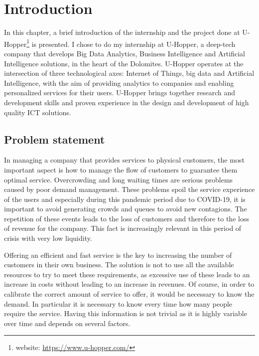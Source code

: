 \chapter{Introduction}
\label{cha:intro}
\vspace{0.4 cm} 

In this chapter, a brief introduction of the internship and the project done at U-Hopper\footnote{ website: \url{https://www.u-hopper.com/} } is presented.
I chose to do my internship at U-Hopper, a deep-tech company that develops Big Data Analytics, Business Intelligence and Artificial Intelligence solutions, in the heart of the Dolomites.
U-Hopper operates at the intersection of three technological axes: Internet of Things, big data and Artificial Intelligence, with the aim of providing analytics to companies and enabling personalized services for their users.
U-Hopper brings together research and development skills and proven experience in the design and development of high quality ICT solutions.


\section{Problem statement}
\label{sec:problem}
\vspace{0.2 cm} 

In managing a company that provides services to physical customers, the most important aspect is how to manage the flow of customers to guarantee them optimal service. Overcrowding and long waiting times are serious problems caused by poor demand management. These problems spoil the service experience of the users and especially during this pandemic period due to COVID-19, it is important to avoid generating crowds and queues to avoid new contagions. The repetition of these events leads to the loss of customers and therefore to the loss of revenue for the company. This fact is increasingly relevant in this period of crisis with very low liquidity.

Offering an efficient and fast service is the key to increasing the number of customers in their own business. The solution is not to use all the available resources to try to meet these requirements, as excessive use of these leads to an increase in costs without leading to an increase in revenues.
Of course, in order to calibrate the correct amount of service to offer, it would be necessary to know the demand. In particular it is necessary to know every time how many people require the service. Having this information is not trivial as it is highly variable over time and depends on several factors.

